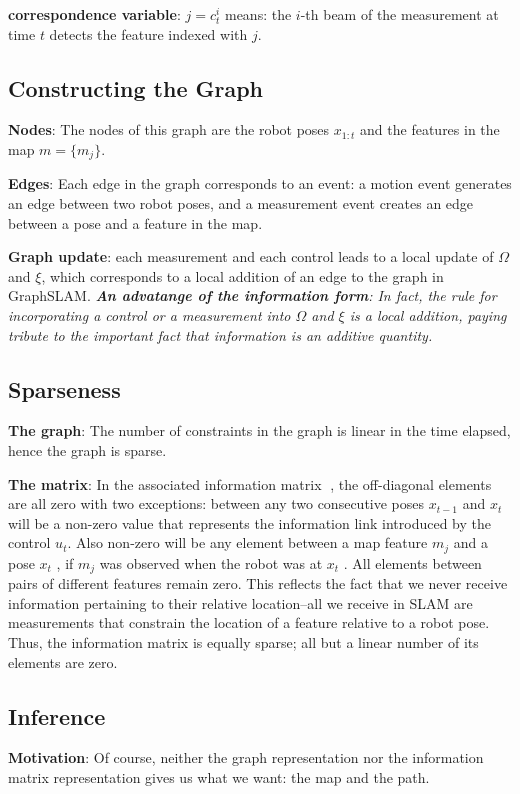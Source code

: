\textbf{correspondence variable}: $j = c_t^i$ means: the $i$-th beam of the measurement at time $t$ detects the feature indexed with $j$.

\subsection{Constructing the Graph}
\textbf{Nodes}: The nodes of this graph are the robot poses $x_{1:t}$ and the features in the map $m = \{m_j\}$.

\textbf{Edges}: Each edge in the graph corresponds to an event: a motion event generates an edge between two robot poses, and a measurement event creates an edge between a pose and a feature in the map.

\textbf{Graph update}: each measurement and each control leads to a local update of $\Omega$ and $\xi$, which corresponds to a local addition of an edge to the graph in GraphSLAM.
\emph{\textbf{An advatange of the information form}: In fact, the rule for incorporating a control or a measurement into $\Omega$ and $\xi$ is a local addition, paying tribute to the important fact that information is an additive quantity.}

\subsection{Sparseness}
\textbf{The graph}: The number of constraints in the graph is linear in the time elapsed, hence the graph is sparse.

\textbf{The matrix}: In the associated information matrix 􏰀, the off-diagonal elements are all zero with two exceptions: between any two consecutive poses $x_{t−1}$ and $x_t$ will be a non-zero value that represents the information link introduced by the control $u_t$. Also non-zero will be any element between a map feature $m_j$ and a pose $x_t$ , if $m_j$ was observed when the robot was at $x_t$ . All elements between pairs of different features remain zero. This reflects the fact that we never receive information pertaining to their relative location--all we receive in SLAM are measurements that constrain the location of a feature relative to a robot pose. Thus, the information matrix is equally sparse; all but a linear number of its elements are zero.

\subsection{Inference}
\textbf{Motivation}: Of course, neither the graph representation nor the information matrix representation gives us what we want: the map and the path.

